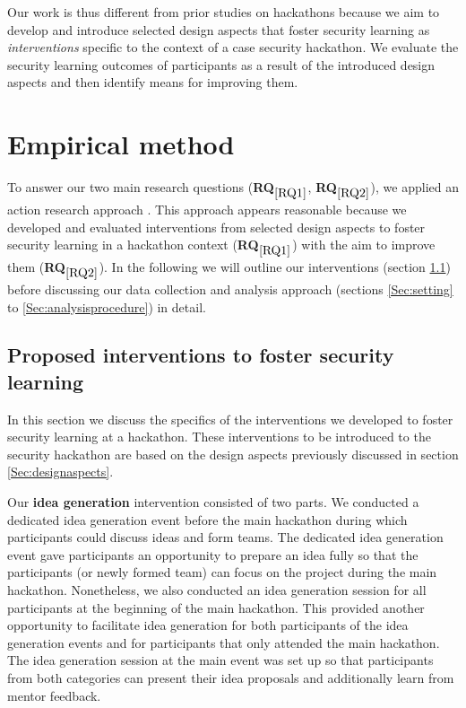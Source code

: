 \documentclass[runningheads]{llncs}
\newcommand{\hr}[1]{\textbf{RQ}$_{\ref{#1}}$}
\begin{document}
Our work is thus different from prior studies on hackathons because we aim to develop and introduce selected design aspects that foster security learning as \textit{interventions} specific to the context of a case security hackathon. We evaluate the security learning outcomes of participants as a result of the introduced design aspects and then identify means for improving them.


\section{Empirical method}
To answer our two main research questions (\hr{RQ1}, \hr{RQ2}), we applied an action research approach \cite{lewin1946action}. This approach appears reasonable because we developed and evaluated interventions from selected design aspects to foster security learning in a hackathon context (\hr{RQ1}) with the aim to improve them (\hr{RQ2}). In the following we will outline our interventions (section \ref{Sec:interventions}) before discussing our data collection and analysis approach (sections \ref{Sec:setting} to \ref{Sec:analysisprocedure}) in detail.

\subsection{Proposed interventions to foster security learning} \label{Sec:interventions}
In this section we discuss the specifics of the interventions we developed to foster security learning at a hackathon. These interventions to be introduced to the security hackathon are based on the design aspects previously discussed in section \ref{Sec:designaspects}.

Our \textbf{idea generation} intervention consisted of two parts. We conducted a dedicated idea generation event before the main hackathon during which participants could discuss ideas and form teams. The dedicated idea generation event gave participants an opportunity to prepare an idea fully so that the participants (or newly formed team) can focus on the project during the main hackathon. Nonetheless, we also conducted an idea generation session for all participants at the beginning of the main hackathon. This provided another opportunity to facilitate idea generation for both participants of the idea generation events and for participants that only attended the main hackathon. The idea generation session at the main event was set up so that participants from both categories can present their idea proposals and additionally learn from mentor feedback.
\end{document}
